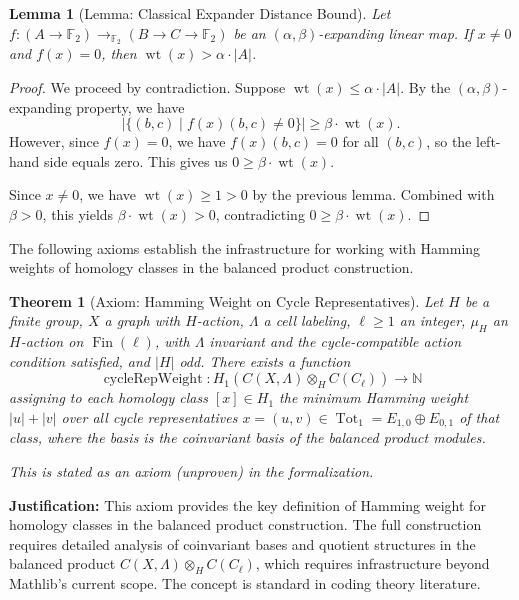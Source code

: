 \documentclass[11pt]{article}
\theoremstyle{plain}
\newtheorem*{theorem}{Theorem}
\newtheorem*{lemma}{Lemma}
\theoremstyle{definition}
\theoremstyle{remark}
\begin{document}
\begin{lemma}[Lemma: Classical Expander Distance Bound]
Let $f : (A \to \mathbb{F}_2) \to_{\mathbb{F}_2} (B \to C \to \mathbb{F}_2)$ be an $(\alpha, \beta)$-expanding linear map. If $x \neq 0$ and $f(x) = 0$, then $\operatorname{wt}(x) > \alpha \cdot |A|$.
\end{lemma}

\begin{proof}
We proceed by contradiction. Suppose $\operatorname{wt}(x) \leq \alpha \cdot |A|$. By the $(\alpha, \beta)$-expanding property, we have
\[
\bigl|\{(b,c) \mid f(x)(b,c) \neq 0\}\bigr| \geq \beta \cdot \operatorname{wt}(x).
\]
However, since $f(x) = 0$, we have $f(x)(b,c) = 0$ for all $(b,c)$, so the left-hand side equals zero. This gives us $0 \geq \beta \cdot \operatorname{wt}(x)$.

Since $x \neq 0$, we have $\operatorname{wt}(x) \geq 1 > 0$ by the previous lemma. Combined with $\beta > 0$, this yields $\beta \cdot \operatorname{wt}(x) > 0$, contradicting $0 \geq \beta \cdot \operatorname{wt}(x)$.
\end{proof}

The following axioms establish the infrastructure for working with Hamming weights of homology classes in the balanced product construction.

\begin{theorem}[Axiom: Hamming Weight on Cycle Representatives]
Let $H$ be a finite group, $X$ a graph with $H$-action, $\Lambda$ a cell labeling, $\ell \geq 1$ an integer, $\mu_H$ an $H$-action on $\operatorname{Fin}(\ell)$, with $\Lambda$ invariant and the cycle-compatible action condition satisfied, and $|H|$ odd. There exists a function
\[
\operatorname{cycleRepWeight} : H_1(C(X,\Lambda) \otimes_H C(C_\ell)) \to \mathbb{N}
\]
assigning to each homology class $[x] \in H_1$ the minimum Hamming weight $|u| + |v|$ over all cycle representatives $x = (u, v) \in \operatorname{Tot}_1 = E_{1,0} \oplus E_{0,1}$ of that class, where the basis is the coinvariant basis of the balanced product modules.

\textit{This is stated as an axiom (unproven) in the formalization.}
\end{theorem}

\textbf{Justification:} This axiom provides the key definition of Hamming weight for homology classes in the balanced product construction. The full construction requires detailed analysis of coinvariant bases and quotient structures in the balanced product $C(X,\Lambda) \otimes_H C(C_\ell)$, which requires infrastructure beyond Mathlib's current scope. The concept is standard in coding theory literature.
\end{document}
